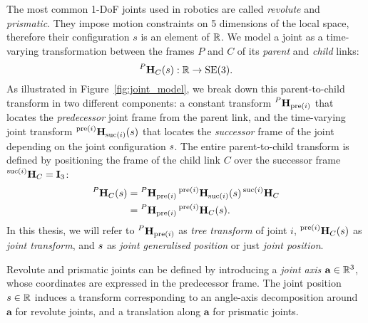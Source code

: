 The most common 1-\ac{DoF} joints used in robotics are called \emph{revolute} and \emph{prismatic}.
They impose motion constraints on 5 dimensions of the local space, therefore their configuration $s$ is an element of $\realn$.
We model a joint as a time-varying transformation between the frames $P$ and $C$ of its \emph{parent} and \emph{child} links:
%
\begin{equation*}
    \homo[P]_C(\shape) : \realn \to \SE(3)
    .
\end{equation*}
%
As illustrated in Figure~\ref{fig:joint_model}, we break down this parent-to-child transform in two different components: a constant transform $\homo[P]_{\operatorname{pre}(i)}$ that locates the \emph{predecessor} joint frame from the parent link, and the time-varying joint transform $\homo[\operatorname{pre}(i)]_{\operatorname{suc}(i)}(\shape)$ that locates the \emph{successor} frame of the joint depending on the joint configuration $\emph{s}$.
The entire parent-to-child transform is defined by positioning the frame of the child link $C$ over the successor frame $\homo[\operatorname{suc}(i)]_C = \eye_3$:
%
\begin{align}
    \label{equation:joint_model_parent_to_child_transform}
    \homo[P]_C(\shape) &= \homo[P]_{\operatorname{pre}(i)} \homo[\operatorname{pre}(i)]_{\operatorname{suc}(i)}(\shape) \homo[\operatorname{suc}(i)]_C \nonumber \\
    &= \homo[P]_{\operatorname{pre}(i)} \homo[\operatorname{pre}(i)]_C(\shape)
    .
\end{align}
%
In this thesis, we will refer to $\homo[P]_{\operatorname{pre}(i)}$ as \emph{tree transform} of joint $i$, $\homo[\operatorname{pre}(i)]_C(\shape)$ as \emph{joint transform}, and $\shape$ as \emph{joint generalised position} or just \emph{joint position}.

\begin{definition*}
    Revolute and prismatic joints can be defined by introducing a \emph{joint axis} $\mathbf{a} \in \realn^3$, whose coordinates are expressed in the predecessor frame.
    The joint position $\shape \in \realn$ induces a transform corresponding to an angle-axis decomposition around $\mathbf{a}$ for revolute joints, and a translation along $\mathbf{a}$ for prismatic joints.
\end{definition*}

